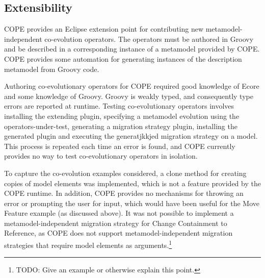 \subsection{Extensibility}
COPE provides an Eclipse extension point for contributing new metamodel-independent co-evolution operators. The operators must be authored in Groovy and be described in a corresponding instance of a metamodel provided by COPE. COPE provides some automation for generating instances of the description metamodel from Groovy code.

Authoring co-evolutionary operators for COPE required good knowledge of Ecore and some knowledge of Groovy. Groovy is weakly typed, and consequently type errors are reported at runtime. Testing co-evolutionary operators involves installing the extending plugin, specifying a metamodel evolution using the operators-under-test, generating a migration strategy plugin, installing the generated plugin and executing the generatjkkjed migration strategy on a model. This process is repeated each time an error is found, and COPE currently provides no way to test co-evolutionary operators in isolation.

To capture the co-evolution examples considered, a clone method for creating copies of model elements was implemented, which is not a feature provided by the COPE runtime. In addition, COPE provides no mechanisms for throwing an error or prompting the user for input, which would have been useful for the Move Feature example (as discussed above).
It was not possible to implement a metamodel-independent migration strategy for Change Containment to Reference, as COPE does not support metamodel-independent migration strategies that require model elements as arguments.\footnote{TODO: Give an example or otherwise explain this point.}